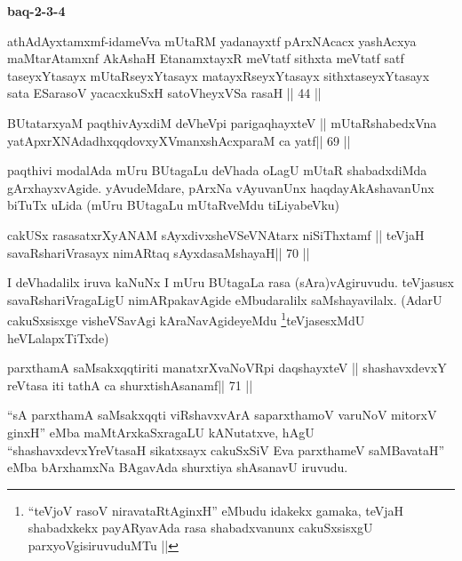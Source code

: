 \begin{center}
{\textbf{baq-2-3-4}}
\end{center}

\begin{shl}
athAdAyxtamxmf-idameVva mUtaRM yadanayxtf pArxNAcacx yashAcxya
maMtarAtamxnf AkAshaH EtanamxtayxR meVtatf sithxta meVtatf satf
taseyxYtasayx mUtaRseyxYtasayx matayxRseyxYtasayx sithxtaseyxYtasayx
sata ESarasoV yacacxkuSxH satoVheyxVSa rasaH || 44 ||
\end{shl}


\begin{shl}
BUtatarxyaM paqthivAyxdiM deVheV\s pi parigaqhayxteV ||
mUtaRshabedxVna yatApxrXNAdadhxqqdovxyXVmanxshAcxparaM ca yatf\hfill || 69 ||
\end{shl}

\begin{artha}
paqthivi modalAda mUru BUtagaLu deVhada oLagU mUtaR shabadxdiMda
gArxhayxvAgide. yAvudeMdare, pArxNa vAyuvanUnx haqdayAkAshavanUnx
biTuTx uLida (mUru BUtagaLu mUtaRveMdu tiLiyabeVku)
\end{artha}



\begin{shl}
cakUSx rasasatxrXyANAM sAyxdivxsheVSeVNAtarx niSiThxtamf ||
teVjaH savaRshariVrasayx nimARtaq sAyxdasaMshayaH\hfill || 70 ||
\end{shl}

\begin{artha}
I deVhadalilx iruva kaNuNx I mUru BUtagaLa rasa (sAra)vAgiruvudu.
teVjasusx savaRshariVragaLigU nimARpakavAgide eMbudaralilx
saMshayavilalx. (AdarU cakuSxsisxge visheVSavAgi
kAraNavAgideyeMdu \footnote{``teVjoV rasoV niravataRtAginxH'' eMbudu
  idakekx gamaka, teVjaH shabadxkekx payARyavAda rasa shabadxvanunx
  cakuSxsisxgU parxyoVgisiruvuduMTu ||}teVjasesxMdU heVLalapxTiTxde)
\end{artha}


\begin{shl}
parxthamA saMsakxqqtiriti manatxrXvaNoVR\s pi daqshayxteV ||
shashavxdevxY reVtasa iti tathA ca shurxtishAsanamf\hfill || 71 ||
\end{shl}

\begin{artha}
``sA parxthamA saMsakxqqti viRshavxvArA saparxthamoV varuNoV mitorxV\s
  ginxH'' eMba maMtArxkaSxragaLU kANutatxve, hAgU
  ``shashavxdevxYreVtasaH sikatxsayx cakuSxSiV Eva parxthameV
  saMBavataH'' eMba bArxhamxNa BAgavAda shurxtiya shAsanavU iruvudu.
\end{artha}

